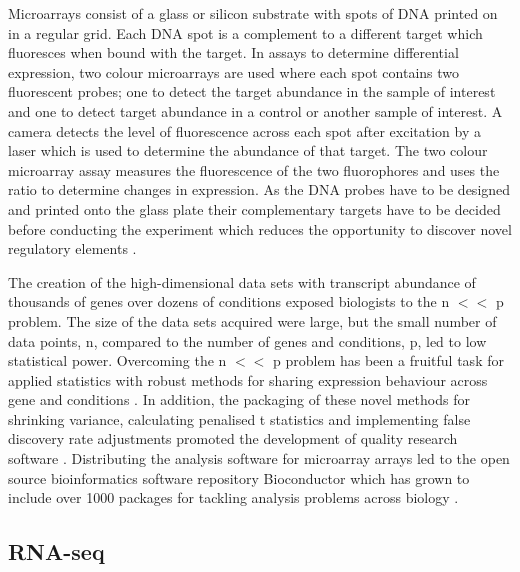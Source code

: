 \documentclass[../main.tex]{subfiles}
\begin{document}
Microarrays consist of a glass or silicon substrate with spots of DNA printed on in a regular grid. 
Each DNA spot is a complement to a different target which fluoresces when bound with the target. 
In assays to determine differential expression, two colour microarrays are used where each spot contains two fluorescent probes; one to detect the target abundance in the sample of interest and one to detect target abundance in a control or another sample of interest.
A camera detects the level of fluorescence across each spot after excitation by a laser which is used to determine the abundance of that target.  
The two colour microarray assay measures the fluorescence of the two fluorophores and uses the ratio to determine changes in expression.
As the DNA probes have to be designed and printed onto the glass plate their complementary targets have to be decided before conducting the experiment which reduces the opportunity to discover novel regulatory elements \parencite{Schena1995}.

The creation of the high-dimensional data sets with transcript abundance of thousands of genes over dozens of conditions exposed biologists to the n $<<$ p problem.
The size of the data sets acquired were large, but the small number of data points, n, compared to the number of genes and conditions, p, led to low statistical power.
Overcoming the n $<<$ p problem has been a fruitful task for applied statistics with robust methods for sharing expression behaviour across gene and conditions \parencite{Gui2005}.
In addition, the packaging of these novel methods for shrinking variance, calculating penalised t statistics and implementing false discovery rate adjustments promoted the development of quality research software \parencite{Smyth2005, Ritchie2015}.
Distributing the analysis software for microarray arrays led to the open source bioinformatics software repository Bioconductor which has grown to include over 1000 packages for tackling analysis problems across biology \parencite{Huber2015}.


\subsection{RNA-seq}
\end{document}
